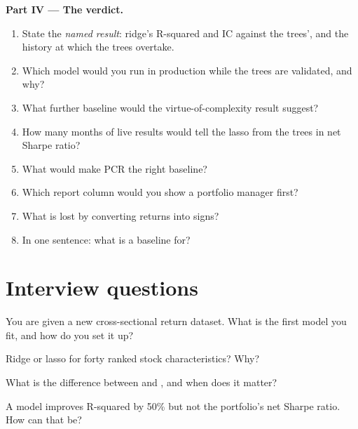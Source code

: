 \begin{problem}
\medskip\noindent\textbf{Part IV --- The verdict.}
\begin{enumerate}[resume]
\item State the \emph{named result}: ridge's R-squared and IC against the trees', and the history at which the trees
overtake.
\item Which model would you run in production while the trees are validated, and why?
\item What further baseline would the virtue-of-complexity result suggest?
\item How many months of live results would tell the lasso from the trees in net Sharpe ratio?
\item What would make PCR the right baseline?
\item Which report column would you show a portfolio manager first?
\item What is lost by converting returns into signs?
\item In one sentence: what is a baseline for?
\end{enumerate}
\end{problem}

\section{Interview questions}

\begin{interviewq}\label{iq:ml:linear-and-regularised-baselines:1}
You are given a new cross-sectional return dataset. What is the first model you fit, and how do you set it up?
\end{interviewq}

\begin{interviewq}\label{iq:ml:linear-and-regularised-baselines:2}
Ridge or lasso for forty ranked stock characteristics? Why?
\end{interviewq}

\begin{interviewq}\label{iq:ml:linear-and-regularised-baselines:3}
What is the difference between  and , and when does it matter?
\end{interviewq}

\begin{interviewq}\label{iq:ml:linear-and-regularised-baselines:4}
A model improves R-squared by 50\% but not the portfolio's net Sharpe ratio. How can that be?
\end{interviewq}

